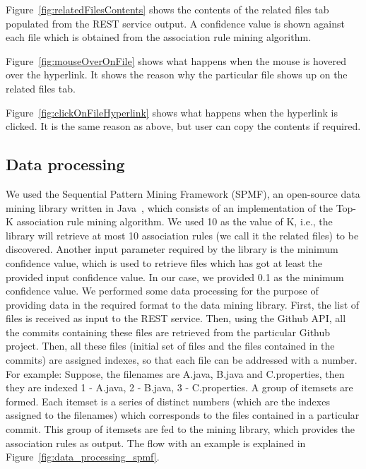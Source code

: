 Figure~\ref{fig:relatedFilesContents} shows the contents of the related files tab populated from the REST service output. A confidence value is shown against each file which is obtained from the association rule mining algorithm.

Figure~\ref{fig:mouseOverOnFile} shows what happens when the mouse is hovered over the hyperlink. It shows the reason why the particular file shows up on the related files tab.

Figure~\ref{fig:clickOnFileHyperlink} shows what happens when the hyperlink is clicked. It is the same reason as above, but user can copy the contents if required.

\subsection{Data processing}
\label{sec:dataprocessing}

We used the Sequential Pattern Mining Framework (SPMF), an open-source data mining library written in Java~\cite{algo_impl}, which consists of an implementation of the Top-K association rule mining algorithm. We used 10 as the value of K, i.e., the library will retrieve at most 10 association rules (we call it the related files) to be discovered. Another input parameter required by the library is the minimum confidence value, which is used to retrieve files which has got at least the provided input confidence value. In our case, we provided 0.1 as the minimum confidence value. We performed some data processing for the purpose of providing data in the required format to the data mining library. First, the list of files is received as input to the REST service. Then, using the Github API, all the commits containing these files are retrieved from the particular Github project. Then, all these files (initial set of files and the files contained in the commits) are assigned indexes, so that each file can be addressed with a number. For example: Suppose, the filenames are A.java, B.java and C.properties, then they are indexed 1 - A.java, 2 - B.java, 3 - C.properties. A group of itemsets are formed. Each itemset is a series of distinct numbers (which are the indexes assigned to the filenames) which corresponds to the files contained in a particular commit. This group of itemsets are fed to the mining library, which provides the association rules as output. The flow with an example is explained in Figure~\ref{fig:data_processing_spmf}.
